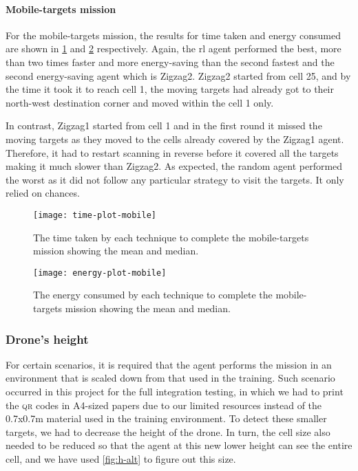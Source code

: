 \documentclass[../main.tex]{subfiles}
\begin{document}
\paragraph{Mobile-targets mission}

For the mobile-targets mission, the results for time taken and energy consumed are shown in 
\cref{fig:time-plot-mobile} and \cref{fig:energy-plot-mobile} respectively.
Again, the \gls{rl} agent performed the best, more than two times
faster and more energy-saving than the
second fastest and the second energy-saving agent which is Zigzag2.
Zigzag2 started from cell 25, and by the time it took it to reach
cell 1, the moving targets had already got to their north-west
destination corner and moved within the cell 1 only.

In contrast, Zigzag1 started from cell 1 and in the first round it
missed the moving targets as they moved to the cells already covered
by the Zigzag1 agent.
Therefore, it had to restart scanning in reverse before it
covered all the targets making it much slower than Zigzag2.
As expected, the random agent performed the worst as it did not follow
any particular strategy to visit the targets. It only relied on
chances.

\begin{figure}[tbp]
	\centering
	\texttt{[image: time-plot-mobile]}
	\caption{The time taken by each technique
        to complete the mobile-targets mission showing the mean and
    median.}
        \label{fig:time-plot-mobile}
\end{figure}

\begin{figure}[tbp]
	\centering
	\texttt{[image: energy-plot-mobile]}
	\caption{The energy consumed by each technique
        to complete the mobile-targets mission showing the mean and
    median.}
        \label{fig:energy-plot-mobile}
\end{figure}

\subsubsection{Drone's height}

For certain scenarios, it is required that the agent performs the
mission in an environment that is scaled down from that used in the
training.
Such scenario occurred in this project for the full integration
testing, in which we had to print the \textsc{qr} codes in A4-sized papers due
to our limited resources instead of the 0.7x0.7m material used in the
training environment.
To detect these smaller targets, we had to decrease the height of the
drone.
In turn, the cell size also needed to be reduced so that the agent at
this new lower height can see the entire cell, and we have used
\cref{fig:h-alt} to figure out this size.
\end{document}
